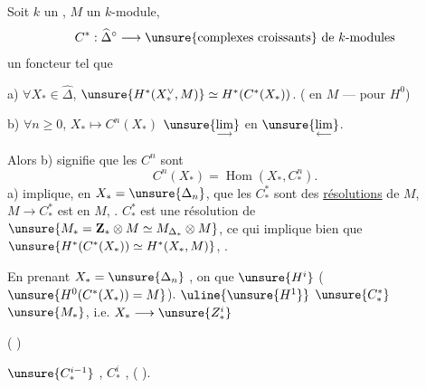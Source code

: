 
Soit $k$ un , $M$ un $k$-module,
\[
C^*:\widehat{\Delta}^{\circ}\longrightarrow
\text{\unsure{complexes croissants} de $k$-modules}
\]
un foncteur  tel que

a) $\forall X_*\in\widehat{\Delta}$,
$\unsure{H^*(X_*^\vee,M)}\simeq H^*(C^*(X_*))$.
( en $M$ ---  pour $H^0$)

b) $\forall n\geq 0$, $X_*\longmapsto C^n(X_*)$
 $\unsure{\underset{\longrightarrow}{\lim}}$ en
$\unsure{\underset{\longleftarrow}{\lim}}$.

Alors b) signifie que les $C^n$ sont 
\[
C^n(X_*)=\operatorname{Hom}(X_*,C_*^n).
\]
a) implique, en  $X_*=\unsure{\Delta_n}$, que les
$C_*^*$ sont des \uline{résolutions} de $M$, 
 $M\longrightarrow C_*^*$ est  en $M$, .
$C_*^*$ est une résolution de
$\unsure{M_*=\mathbf Z_*\otimes M\simeq M_{\Delta_*}\otimes M}$,
ce qui implique bien que
$\unsure{H^*(C^*(X_*))\simeq H^*(X_*,M)}$,
 .

En prenant $X_*=\unsure{\Delta_n}$ , on 
que $\unsure{H^i}$ 
($\unsure{H^0(C^*(X_*))=M}$).
 $\uline{\unsure{H^1}}$  
$\unsure{C_*^*}$ 
 $\unsure{M_*}$\unsure{)}, i.e.
 $X_*\longrightarrow\unsure{Z_*^i}$

(
)

  $\unsure{C_*^{i-1}}$ ,
 
  
$C_*^i$ ,
(   ).

